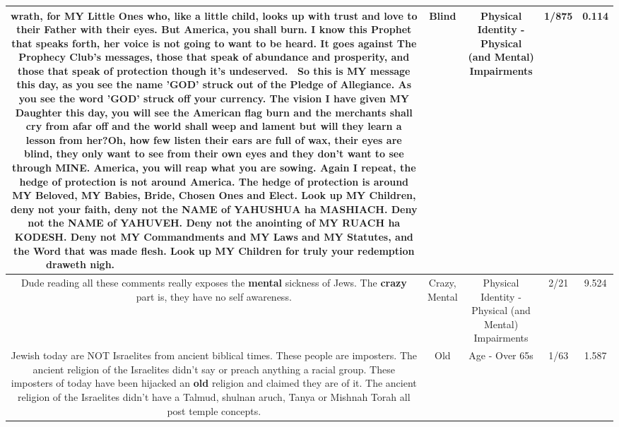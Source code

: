 \documentclass[11pt]{article}
\newlength\mylength
\begin{document}
\begin{center}
\begin{longtable}{|C{.65\mylength}|C{.30\mylength}|C{.12\mylength}|C{.12\mylength}|C{.12\mylength}|}
wrath, for MY Little Ones who, like a little child, looks up with trust and love to their Father with their eyes. But America, you shall burn. I know this Prophet that speaks forth, her voice is not going to want to be heard. It goes against The Prophecy Club's messages, those that speak of abundance and prosperity, and those that speak of protection though it's undeserved.  So this is MY message this day, as you see the name 'GOD' struck out of the Pledge of Allegiance. As you see the word 'GOD' struck off your currency. The vision I have given MY Daughter this day, you will see the American flag burn and the merchants shall cry from afar off and the world shall weep and lament but will they learn a lesson from her?Oh, how few listen their ears are full of wax, their eyes are \textbf{blind}, they only want to see from their own eyes and they don't want to see through MINE. America, you will reap what you are sowing. Again I repeat, the hedge of protection is not around America. The hedge of protection is around MY Beloved, MY Babies, Bride, Chosen Ones and Elect. Look up MY Children, deny not your faith, deny not the NAME of YAHUSHUA ha MASHIACH. Deny not the NAME of YAHUVEH. Deny not the anointing of MY RUACH ha KODESH. Deny not MY Commandments and MY Laws and MY Statutes, and the Word that was made flesh. Look up MY Children for truly your redemption draweth nigh.~~~~~~~~~~~~~~~~~~~~~~~~~~~~~~~~~~~~~~~~~~~~~~~\normalsize   & Blind & Physical Identity - Physical (and Mental) Impairments & 1/875 & 0.114 \\  \hline
  \small Dude reading all these comments really exposes the \textbf{mental} sickness of Jews. The \textbf{crazy} part is, they have no self awareness.\normalsize   & Crazy, Mental & Physical Identity - Physical (and Mental) Impairments & 2/21 & 9.524 \\  \hline
  \small Jewish today are NOT Israelites from ancient biblical times.    These people are imposters.    The ancient religion of the Israelites didn't say or preach anything a racial group.    These imposters of today have been hijacked an \textbf{old} religion and claimed they are of it.   The ancient religion of the Israelites didn't have a Talmud, shulnan aruch, Tanya or Mishnah Torah all post temple concepts.\normalsize   & Old & Age - Over 65s & 1/63 & 1.587 \\  \hline

\end{longtable}
\end{center}
\end{document}
